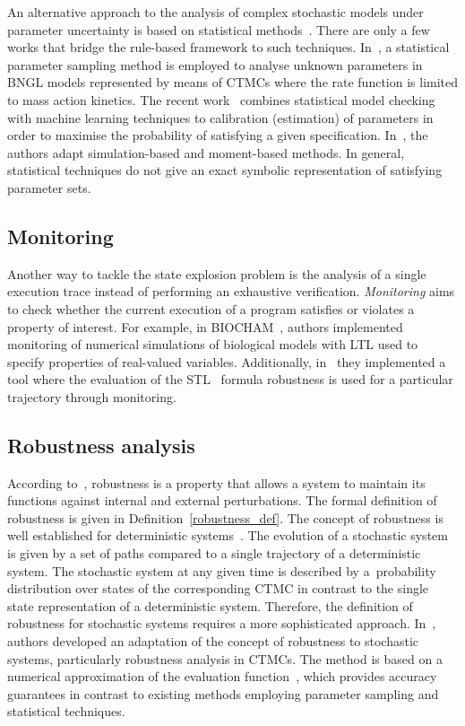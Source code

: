 \documentclass[11pt,a4paper]{report}
\begin{document}
An alternative approach to the analysis of complex stochastic models under
parameter uncertainty is based on statistical methods~\cite{BackenkohlerBW18,Bortolussi2016,Bortolussi2018,Luck2016}. There are only a few works that bridge the rule-based framework to such techniques. In~\cite{liu2016parameter}, a statistical parameter sampling method is employed to analyse unknown parameters in BNGL models represented by means of CTMCs where the rate function is limited to mass action kinetics. The recent work~\cite{KJ18} combines statistical model checking with machine learning techniques to calibration (estimation) of parameters in order to maximise the probability of satisfying a given specification. In~\cite{Bock15}, the authors adapt simulation-based and moment-based methods. In general, statistical techniques do not give an exact symbolic representation of satisfying parameter sets. 

\subsection{Monitoring}

Another way to tackle the state explosion problem is the analysis of a single execution trace instead of performing an exhaustive verification. \emph{Monitoring} aims to check whether the current execution of a program satisfies or violates a property of interest. For example, in BIOCHAM~\cite{calzone2006biocham}, authors implemented monitoring of numerical simulations of biological models with LTL used to specify properties of real-valued variables. Additionally, in~\cite{donze2010breach} they implemented a tool where the evaluation of the STL~\cite{maler2004monitoring} formula robustness is used for a particular trajectory through monitoring.

\subsection{Robustness analysis}

According to~\cite{kitano2004biological}, robustness is a property that allows a system to maintain its functions against internal and external perturbations. The formal definition of robustness is given in Definition~\ref{robustness_def}. The concept of robustness is well established for deterministic systems~\cite{donze2011robustness,rizk2009general}. The evolution of a stochastic system is given
by a set of paths compared to a single trajectory of a deterministic system. The stochastic system at any given time is described by a~probability distribution over states of the corresponding CTMC in contrast to the single state representation of a deterministic system. Therefore, the definition of robustness for stochastic systems requires a more sophisticated approach. In~\cite{vceska2014robustness}, authors developed an adaptation of the concept of robustness to stochastic systems, particularly robustness analysis in CTMCs. The method is based on a numerical approximation of the evaluation function~\cite{brim2013exploring}, which provides accuracy guarantees in contrast to existing methods employing parameter sampling and statistical techniques.
\end{document}
